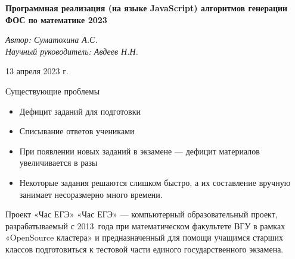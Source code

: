 \documentclass[aspectratio=169]{beamer}
\begin{document}
\begin{frame}
   \begin{center}
    \vspace{1.5cm}
    \Large\textcolor{NordBrightBlue}{\textbf{Программная реализация (на языке JavaScript) алгоритмов генерации ФОС по математике 2023}}\\
        \end{center}
        \vspace{1cm}
        \large\textcolor{NordBlue}{\textit{Автор: Суматохина А.С.}}\\
        \large\textcolor{NordBlue}{\textit{Научный руководитель: Авдеев Н.Н.}}\\
        \vspace{1cm}
        \begin{center}
            13 апреля 2023 г.
        \end{center}
        
\end{frame}

\begin{frame}{Существующие проблемы}
    \begin{itemize}
        \item Дефицит заданий для подготовки
        \item Списывание ответов учениками
        \item При появлении новых заданий в экзамене — дефицит материалов увеличивается в разы
        \item Некоторые задания решаются слишком быстро, а их составление вручную занимает несоразмерно много времени.
    \end{itemize}
\end{frame}

\begin{frame}{Проект «Час ЕГЭ»}
    «Час ЕГЭ» — компьютерный образовательный проект, разрабатываемый с 2013~года при математическом факультете ВГУ в рамках «OpenSource кластера» и предназначенный для помощи учащимся старших классов подготовиться к тестовой части единого государственного экзамена.
\end{frame}
\end{document}
